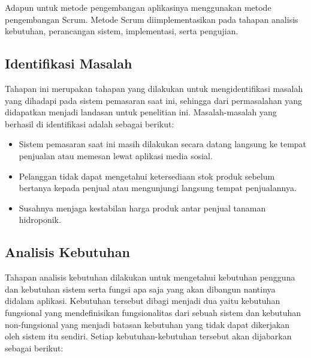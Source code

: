\par Adapun untuk metode pengembangan aplikasinya menggunakan metode pengembangan Scrum. Metode Scrum diimplementasikan pada tahapan analisis kebutuhan, perancangan sistem, implementasi, serta pengujian.

\fancyhf{} 
\fancyfoot[R]{\thepage}

\subsection{Identifikasi Masalah}
Tahapan ini merupakan tahapan yang dilakukan untuk mengidentifikasi masalah yang dihadapi pada sistem pemasaran saat ini, sehingga dari permasalahan yang didapatkan menjadi landasan untuk penelitian ini. Masalah-masalah yang berhasil di identifikasi adalah sebagai berikut:

\begin{itemize}
	\item Sistem pemasaran saat ini masih dilakukan secara datang langsung ke tempat penjualan atau memesan lewat aplikasi media sosial.
	\item Pelanggan tidak dapat mengetahui ketersediaan stok produk sebelum bertanya kepada penjual atau mengunjungi langsung tempat penjualannya.
	\item Susahnya menjaga kestabilan harga produk antar penjual tanaman hidroponik.
\end{itemize}

\subsection{Analisis Kebutuhan}
Tahapan analisis kebutuhan dilakukan untuk mengetahui kebutuhan pengguna dan kebutuhan sistem serta fungsi apa saja yang akan dibangun nantinya didalam aplikasi. Kebutuhan tersebut dibagi menjadi dua yaitu kebutuhan fungsional yang mendefinisikan fungsionalitas dari sebuah sistem dan kebutuhan non-fungsional yang menjadi batasan kebutuhan yang tidak dapat dikerjakan oleh sistem itu sendiri. Setiap kebutuhan-kebutuhan tersebut akan dijabarkan sebagai berikut:

